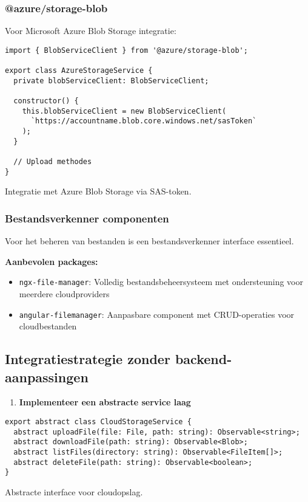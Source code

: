 \subsubsection{@azure/storage-blob}

Voor Microsoft Azure Blob Storage integratie:

\begin{listing}[H]
\begin{verbatim}
import { BlobServiceClient } from '@azure/storage-blob';

export class AzureStorageService {
  private blobServiceClient: BlobServiceClient;
  
  constructor() {
    this.blobServiceClient = new BlobServiceClient(
      `https://accountname.blob.core.windows.net/sasToken`
    );
  }

  // Upload methodes
}
\end{verbatim}
\caption[Azure integratie]{Integratie met Azure Blob Storage via SAS-token.}
\end{listing}

\subsubsection{Bestandsverkenner componenten}

Voor het beheren van bestanden is een bestandsverkenner interface essentieel.

\textbf{Aanbevolen packages:}
\begin{itemize}
    \item \texttt{ngx-file-manager}: Volledig bestandsbeheersysteem met ondersteuning voor meerdere cloudproviders
    \item \texttt{angular-filemanager}: Aanpasbare component met CRUD-operaties voor cloudbestanden
\end{itemize}

\subsection{Integratiestrategie zonder backend-aanpassingen}

\begin{enumerate}
    \item \textbf{Implementeer een abstracte service laag}
\end{enumerate}

\begin{listing}[H]
\begin{verbatim}
export abstract class CloudStorageService {
  abstract uploadFile(file: File, path: string): Observable<string>;
  abstract downloadFile(path: string): Observable<Blob>;
  abstract listFiles(directory: string): Observable<FileItem[]>;
  abstract deleteFile(path: string): Observable<boolean>;
}
\end{verbatim}
\caption[Abstracte storage-interface]{Abstracte interface voor cloudopslag.}
\end{listing}

